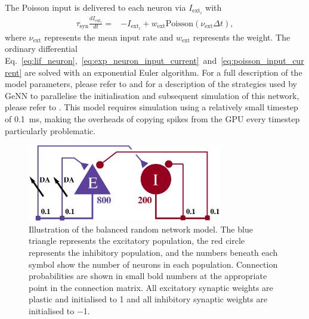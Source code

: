 \documentclass[utf8]{frontiersSCNS} %
\begin{document}
The Poisson input is delivered to each neuron via $I_{\text{ext}_{i}}$ with
%
\begin{align}
    \tau_{\text{syn}} \frac{dI_{\text{ext}_{i}}}{dt} = & -I_{\text{ext}_{i}} + w_{\text{ext}} \text{Poisson}(\nu_{\text{ext}} \Delta t),\label{eq:poisson_input_current}
\end{align}
%
where $\nu_{\text{ext}}$ represents the mean input rate and $w_{\text{ext}}$ represents the weight.
The ordinary differential Eq.~\ref{eq:lif_neuron},~\ref{eq:exp_neuron_input_current}~and~\ref{eq:poisson_input_current} are solved with an exponential Euler algorithm.
For a full description of the model parameters, please refer to \citet[tables 4 and 5]{Potjans2012} and for a description of the strategies used by GeNN to parallelise the initialisation and subsequent simulation of this network, please refer to \citet[section 2.3]{Knight2018}.
This model requires simulation using a relatively small timestep of \SI{0.1}{\milli\second}, making the overheads of copying spikes from the GPU every timestep particularly problematic.
%
\begin{figure}[t!]
    \begin{center}
        \includegraphics[width=85mm]{figures/circuit2.eps}
    \end{center}
    \caption{Illustration of the balanced random network model.
    The blue triangle represents the excitatory population, the red circle represents the inhibitory population, and the numbers beneath each symbol show the number of neurons in each population.
    Connection probabilities are shown in small bold numbers at the appropriate point in the connection matrix.
    All excitatory synaptic weights are plastic and initialised to \num{1} and all inhibitory synaptic weights are initialised to \num{-1}.}
    \label{fig:pavlovian_circuit}
\end{figure}
%
\end{document}
